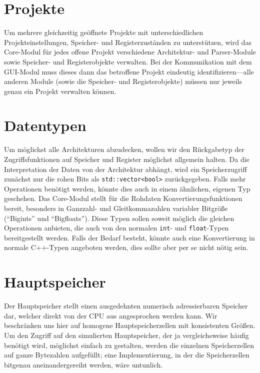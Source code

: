 \section{Projekte}

Um mehrere gleichzeitig geöffnete Projekte mit unterschiedlichen Projekteinstellungen, Speicher- und Registerzuständen zu unterstützen, wird das Core-Modul für jedes offene Projekt verschiedene Architektur- und Parser-Module sowie Speicher- und Registerobjekte verwalten. Bei der Kommunikation mit dem GUI-Modul muss dieses dann das betroffene Projekt eindeutig identifizieren---alle anderen Module (sowie die Speicher- und Registerobjekte) müssen nur jeweils genau ein Projekt verwalten können.

\section{Datentypen}

Um möglichst alle Architekturen abzudecken, wollen wir den Rückgabetyp der Zugriffsfunktionen auf Speicher und Register möglichst allgemein halten. Da die Interpretation der Daten von der Architektur abhängt, wird ein Speicherzugriff zunächst nur die rohen Bits als \lstinline[style=C++]!std::vector<bool>! zurückgegeben. Falls mehr Operationen benötigt werden, könnte dies auch in einem ähnlichen, eigenen Typ geschehen. Das Core-Modul stellt für die Rohdaten Konvertierungsfunktionen bereit, besonders in Ganzzahl- und Gleitkommazahlen variabler Bitgrö{\ss}e (``Bigints'' und ``Bigfloats''). Diese Typen sollen soweit möglich die gleichen Operationen anbieten, die auch von den normalen \lstinline[style=C++]!int!- und \lstinline[style=C++]!float!-Typen bereitgestellt werden. Falls der Bedarf besteht, könnte auch eine Konvertierung in normale C++-Typen angeboten werden, dies sollte aber per se nicht nötig sein.


\section{Hauptspeicher}
Der Hauptspeicher stellt einen ausgedehnten numerisch adressierbaren Speicher dar, welcher direkt von der CPU aus angesprochen werden kann. Wir beschränken uns hier auf homogene Hauptspeicherzellen mit konsistenten Grö{\ss}en. Um den Zugriff auf den simulierten Hauptspeicher, der ja vergleichsweise häufig benötigt wird, möglichst einfach zu gestalten, werden die einzelnen Speicherzellen auf ganze Bytezahlen aufgefüllt; eine Implementierung, in der die Speicherzellen bitgenau aneinandergereiht werden, wäre untunlich.

